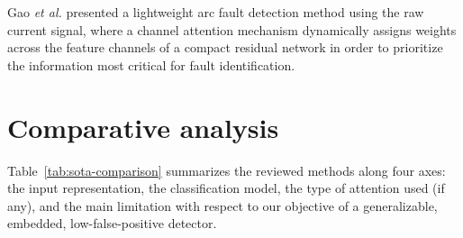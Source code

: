 \medskip

Gao \emph{et al.} \cite{gao2023channel} presented a lightweight arc fault detection method using the raw current signal, where a channel attention mechanism dynamically assigns weights across the feature channels of a compact residual network in order to prioritize the information most critical for fault identification.

\section{Comparative analysis}
\label{sec:sota-comparative}

Table~\ref{tab:sota-comparison} summarizes the reviewed methods along four axes: the input representation, the classification model, the type of attention used (if any), and the main limitation with respect to our objective of a generalizable, embedded, low-false-positive detector.

